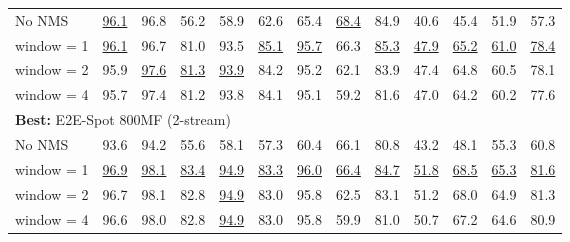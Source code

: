 \documentclass[runningheads]{llncs}
\newcommand{\OURMETHOD}{{E2E-Spot}\xspace}
\newcommand{\best}[1]{\underline{#1}}
\begin{document}
\begin{table*}[p]
{\begin{tabularx}{\textwidth}{l
        rr
        rr
        rr
        rr
        rr
        rr
    }
            \hspace{0.06in} No NMS
                & \best{96.1} & 96.8
                & 56.2 & 58.9
                & 62.6 & 65.4
                & \best{68.4} & 84.9
                & 40.6 & 45.4
                & 51.9 & 57.3\\
            \hspace{0.06in} window = 1
                & \best{96.1} & 96.7
                & 81.0 & 93.5
                & \best{85.1} & \best{95.7}
                & 66.3 & \best{85.3}
                & \best{47.9} & \best{65.2}
                & \best{61.0} & \best{78.4} \\
            \hspace{0.06in} window = 2
                & 95.9 & \best{97.6}
                & \best{81.3} & \best{93.9}
                & 84.2 & 95.2
                & 62.1 & 83.9
                & 47.4 & 64.8
                & 60.5 & 78.1 \\
            \hspace{0.06in} window = 4
                & 95.7 & 97.4
                & 81.2 & 93.8
                & 84.1 & 95.1
                & 59.2 & 81.6
                & 47.0 & 64.2
                & 60.2 & 77.6 \\

        \midrule
        \multicolumn{13}{l}{{\bf Best:} \OURMETHOD 800MF (2-stream)} \\
            \hspace{0.06in} No NMS
                & 93.6 & 94.2
                & 55.6 & 58.1
                & 57.3 & 60.4
                & 66.1 & 80.8
                & 43.2 & 48.1
                & 55.3 & 60.8 \\
            \hspace{0.06in} window = 1
                & \best{96.9} & \best{98.1}
                & \best{83.4} & \best{94.9}
                & \best{83.3} & \best{96.0}
                & \best{66.4} & \best{84.7}
                & \best{51.8} & \best{68.5}
                & \best{65.3} & \best{81.6} \\
            \hspace{0.06in} window = 2
                & 96.7 & 98.1
                & 82.8 & \best{94.9}
                & 83.0 & 95.8
                & 62.5 & 83.1
                & 51.2 & 68.0
                & 64.9 & 81.3 \\
            \hspace{0.06in} window = 4
                & 96.6 & 98.0
                & 82.8 & \best{94.9}
                & 83.0 & 95.8
                & 59.9 & 81.0
                & 50.7 & 67.2
                & 64.6 & 80.9 \\


\end{tabularx}}
\end{table*}
\end{document}
